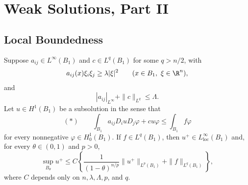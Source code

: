 \chapter{Weak Solutions, Part II}

\section{Local Boundedness}

\begin{theorem}\label{hanlin:weaksol-part2-local-boundedness}
Suppose $a_{ij}\in L^\infty(B_1)$ and $c\in L^q(B_1)$ for some
$q>n/2$, with
\[
a_{ij}(x)\xi_i\xi_j\geq\lambda|\xi|^2
\qquad(x\in B_1,\ \xi\in\R^n),
\]
and
\[
|a_{ij}|_{L^\infty}+\|c\|_{L^q}\leq\Lambda.
\]
Let $u\in H^1(B_1)$ be a subsolution in the sense that
\[
(*)\qquad
\int_{B_1}a_{ij}D_i uD_j\varphi+cu\varphi
\leq\int_{B_1}f\varphi
\]
for every nonnegative $\varphi\in H^1_0(B_1)$. If $f\in L^q(B_1)$,
then $u^+\in L^\infty_{\mathrm{loc}}(B_1)$ and, for every
$\theta\in(0,1)$ and $p>0$,
\[
\sup_{B_\theta}u^+
\leq C\left\{
\frac{1}{(1-\theta)^{n/p}}\|u^+\|_{L^p(B_1)}
+\|f\|_{L^q(B_1)}\right\},
\]
where $C$ depends only on $n,\lambda,\Lambda,p$, and $q$.
\end{theorem}

